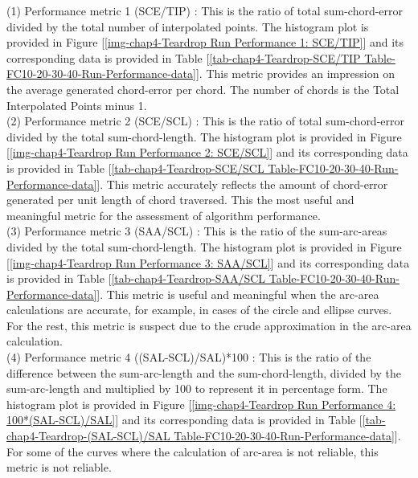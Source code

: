 (1) Performance metric 1 (SCE/TIP) : This is the ratio of total sum-chord-error divided by the total number of interpolated points. The histogram plot is provided in Figure [\ref{img-chap4-Teardrop Run Performance 1: SCE/TIP}] and its corresponding data is provided in Table [\ref{tab-chap4-Teardrop-SCE/TIP Table-FC10-20-30-40-Run-Performance-data}]. This metric provides an impression on the average generated chord-error per chord. The number of chords is the Total Interpolated Points minus 1.\\

(2) Performance metric 2 (SCE/SCL) : This is the ratio of total sum-chord-error divided by the total sum-chord-length. The histogram plot is provided in Figure [\ref{img-chap4-Teardrop Run Performance 2: SCE/SCL}] and its corresponding data is provided in Table [\ref{tab-chap4-Teardrop-SCE/SCL Table-FC10-20-30-40-Run-Performance-data}]. This metric accurately reflects the amount of chord-error generated per unit length of chord traversed. This the most useful and meaningful metric for the assessment of algorithm performance.\\
  
(3) Performance metric 3 (SAA/SCL) : This is the ratio of the sum-arc-areas divided by the total sum-chord-length. The histogram plot is provided in Figure [\ref{img-chap4-Teardrop Run Performance 3: SAA/SCL}] and its corresponding data is provided in Table [\ref{tab-chap4-Teardrop-SAA/SCL Table-FC10-20-30-40-Run-Performance-data}]. This metric is useful and meaningful when the arc-area calculations are accurate, for example, in  cases of the circle and ellipse curves. For the rest, this metric is suspect due to the crude approximation in the arc-area calculation. \\

(4) Performance metric 4 ((SAL-SCL)/SAL)*100 : This is the ratio of the difference between the sum-arc-length and the sum-chord-length, divided by the sum-arc-length and multiplied by 100 to represent it in percentage form. The histogram plot is provided in Figure [\ref{img-chap4-Teardrop Run Performance 4: 100*(SAL-SCL)/SAL}] and its corresponding data is provided in Table [\ref{tab-chap4-Teardrop-(SAL-SCL)/SAL Table-FC10-20-30-40-Run-Performance-data}]. For some of the curves where the calculation of arc-area is not reliable, this metric is not reliable.  

\clearpage
\pagebreak

